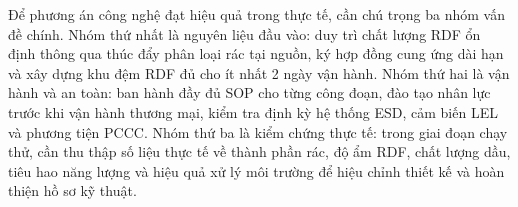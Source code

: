 \documentclass[../main.tex]{subfiles}
\begin{document}
Để phương án công nghệ đạt hiệu quả trong thực tế, cần chú trọng ba nhóm vấn đề chính. Nhóm thứ nhất là nguyên liệu đầu vào: duy trì chất lượng RDF ổn định thông qua thúc đẩy phân loại rác tại nguồn, ký hợp đồng cung ứng dài hạn và xây dựng khu đệm RDF đủ cho ít nhất 2 ngày vận hành. Nhóm thứ hai là vận hành và an toàn: ban hành đầy đủ SOP cho từng công đoạn, đào tạo nhân lực trước khi vận hành thương mại, kiểm tra định kỳ hệ thống ESD, cảm biến LEL và phương tiện PCCC. Nhóm thứ ba là kiểm chứng thực tế: trong giai đoạn chạy thử, cần thu thập số liệu thực tế về thành phần rác, độ ẩm RDF, chất lượng dầu, tiêu hao năng lượng và hiệu quả xử lý môi trường để hiệu chỉnh thiết kế và hoàn thiện hồ sơ kỹ thuật.
\end{document}
